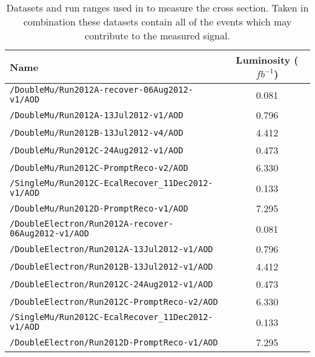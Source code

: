 \begin{table}[hbt]
\caption{\label{tab:DilDsets_lumi}Datasets and run ranges used in to measure the cross section. Taken in combination these datasets contain all of the events which may contribute to the measured signal.}
\begin{center}
\begin{tabular}{lc}\hline\hline
Name		 & Luminosity ($fb^{-1}$) \\ \hline
\verb=/DoubleMu/Run2012A-recover-06Aug2012-v1/AOD=                  &  0.081 \\ 
\verb=/DoubleMu/Run2012A-13Jul2012-v1/AOD=                                         & 0.796               \\ 
\verb=/DoubleMu/Run2012B-13Jul2012-v4/AOD=                                          & 4.412             \\ 
\verb=/DoubleMu/Run2012C-24Aug2012-v1/AOD=                                 & 0.473\\  
\verb=/DoubleMu/Run2012C-PromptReco-v2/AOD=                                    & 6.330                \\ 
\verb=/SingleMu/Run2012C-EcalRecover_11Dec2012-v1/AOD=           & 0.133\\
\verb=/DoubleMu/Run2012D-PromptReco-v1/AOD=                                 &  7.295 \\

\verb=/DoubleElectron/Run2012A-recover-06Aug2012-v1/AOD=              & 0.081              \\ 
\verb=/DoubleElectron/Run2012A-13Jul2012-v1/AOD=                            & 0.796                    \\ 
\verb=/DoubleElectron/Run2012B-13Jul2012-v1/AOD=                           & 4.412\\ 
\verb=/DoubleElectron/Run2012C-24Aug2012-v1/AOD=                           & 0.473                 \\ 
\verb=/DoubleElectron/Run2012C-PromptReco-v2/AOD=                          & 6.330             \\ 
\verb=/SingleMu/Run2012C-EcalRecover_11Dec2012-v1/AOD=           & 0.133\\
\verb=/DoubleElectron/Run2012D-PromptReco-v1/AOD=                        &  7.295 \\


\end{tabular}
\end{center}
\end{table}
